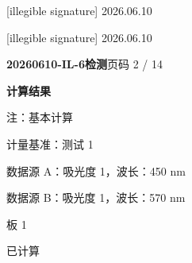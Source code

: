 \documentclass[UTF8,10pt,a4paper,fontset=fandol]{ctexart}
\newcommand{\handwritten}[1]{#1}
\begin{document}

\medskip
\handwritten{[illegible signature]}
\hspace{1em}
\handwritten{2026.06.10}

\medskip
\handwritten{[illegible signature]}
\hspace{1em}
\handwritten{2026.06.10}

\newpage

\begin{center}
\textbf{20260610-IL-6检测}\hfill 页码 2 / 14
\end{center}

\noindent
\textbf{计算结果}

\noindent
注：基本计算

\noindent
计量基准：测试 1

\noindent
数据源 A：吸光度 1，波长：450 nm

\noindent
数据源 B：吸光度 1，波长：570 nm

\vspace{0.5em}

\noindent
板 1

\noindent
已计算

\vspace{0.5em}
\end{document}
